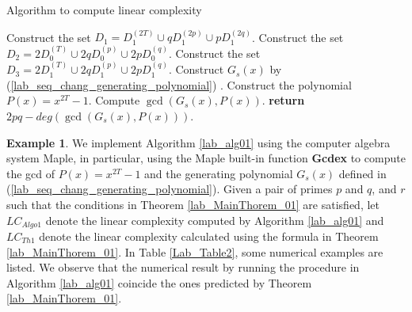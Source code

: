 \documentclass{mcom-l}
\theoremstyle{definition}
\newtheorem{sec3exp1}{Example}[section]
\numberwithin{equation}{section}
\begin{document}
    \begin{algorithm}
      \caption{Algorithm to compute linear complexity}\label{lab_alg01}
      \begin{algorithmic}[1]
      \State Construct the set $D_{1}=D_{1}^{(2T)}\cup qD_{1}^{(2p)}\cup pD_{1}^{(2q)}$.
      \State Construct the set $D_{2}=2D_{0}^{(T)}\cup 2qD_{0}^{(p)}\cup 2pD_{0}^{(q)}$.
      \State Construct the set $D_{3}=2D_{1}^{(T)}\cup 2qD_{1}^{(p)}\cup 2pD_{1}^{(q)}$.
      \State Construct $ G_{s}(x) $ by (\ref{lab_seq_chang_generating_polynomial}) .
      \State Construct the polynomial $ P(x)=x^{2T}-1$.
      \State Compute $ \gcd(G_{s}(x), P(x))$.
      \State \textbf{return} $ 2pq-deg(\gcd(G_{s}(x), P(x))) $.
      \EndProcedure
      \end{algorithmic}
      \end{algorithm}
    \begin{sec3exp1}\label{lab_sec3exp1}
      We implement Algorithm \ref{lab_alg01} using the computer algebra system Maple, in particular, using the Maple built-in function \textbf{Gcdex} to compute the gcd of $ P(x) = x^{2T}-1$ and the generating polynomial $ G_{s}(x) $ defined in (\ref{lab_seq_chang_generating_polynomial}). Given a pair of primes $ p $ and $ q $, and $ r $ such that the conditions in Theorem \ref{lab_MainThorem_01} are satisfied, let $ LC_{Algo1} $ denote the linear complexity computed by Algorithm \ref{lab_alg01} and $ LC_{Th1} $ denote the linear complexity calculated using the formula in Theorem \ref{lab_MainThorem_01}. In Table \ref{Lab_Table2}, some numerical examples are listed. We observe that the numerical result by running the procedure in Algorithm \ref{lab_alg01} coincide the ones predicted by Theorem \ref{lab_MainThorem_01}.
      \end{sec3exp1}
\end{document}
